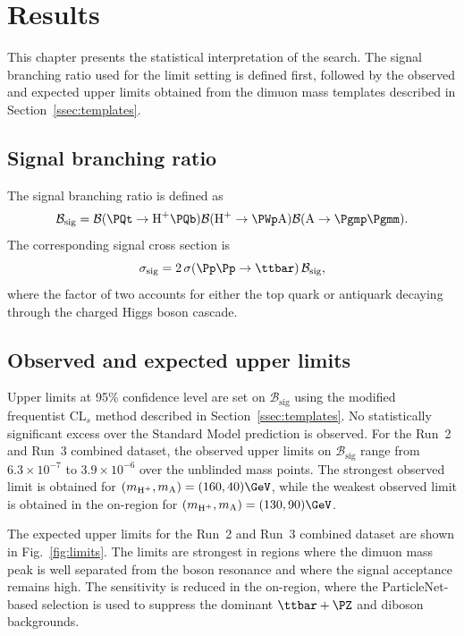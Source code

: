 \chapter{Results}
\label{ch:results}

This chapter presents the statistical interpretation of the search. The signal branching ratio used for the limit setting is defined first, followed by the observed and expected upper limits obtained from the dimuon mass templates described in Section~\ref{ssec:templates}.

\section{Signal branching ratio}

The signal branching ratio is defined as
\begin{equation}
\mathcal{B}_{\text{sig}} =
\mathcal{B}(\PQt \to \PHp\PQb)
\mathcal{B}(\PHp \to \PWp\PA)
\mathcal{B}(\PA \to \Pgmp\Pgmm).
\label{eq:bsig_results}
\end{equation}
The corresponding signal cross section is
\begin{equation}
\sigma_{\text{sig}} =
2 \, \sigma(\Pp\Pp \to \ttbar) \, \mathcal{B}_{\text{sig}},
\label{eq:sigxsec_results}
\end{equation}
where the factor of two accounts for either the top quark or antiquark decaying through the charged Higgs boson cascade.

\section{Observed and expected upper limits}

Upper limits at 95\% confidence level are set on $\mathcal{B}_{\text{sig}}$ using the modified frequentist CL$_s$ method described in Section~\ref{ssec:templates}. No statistically significant excess over the Standard Model prediction is observed. For the Run~2 and Run~3 combined dataset, the observed upper limits on $\mathcal{B}_{\text{sig}}$ range from $6.3 \times 10^{-7}$ to $3.9 \times 10^{-6}$ over the unblinded mass points. The strongest observed limit is obtained for $(\mHc, \mA) = (160, 40)\GeV$, while the weakest observed limit is obtained in the on-\PZ region for $(\mHc, \mA) = (130, 90)\GeV$.

The expected upper limits for the Run~2 and Run~3 combined dataset are shown in Fig.~\ref{fig:limits}. The limits are strongest in regions where the dimuon mass peak is well separated from the \PZ boson resonance and where the signal acceptance remains high. The sensitivity is reduced in the on-\PZ region, where the ParticleNet-based selection is used to suppress the dominant $\ttbar+\PZ$ and diboson backgrounds.

